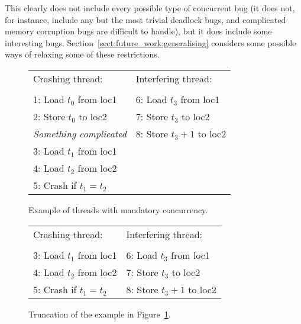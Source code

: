 This clearly does not include every possible type of concurrent bug
(it does not, for instance, include any but the most trivial deadlock
bugs, and complicated memory corruption bugs are difficult to handle),
but it does include some interesting bugs.
Section~\ref{sect:future_work:generalising} considers some possible
ways of relaxing some of these restrictions.

\begin{figure}
\begin{centering}
\hfill
\begin{tabular}{p{8cm}l}
Crashing thread:\hfill         & Interfering thread: \\
\\
1: Load $t_0$ from loc1        & 6: Load $t_3$ from loc1 \\
2: Store $t_0$ to loc2         & 7: Store $t_3$ to loc2 \\
\textit{Something complicated} & 8: Store $t_3 + 1$ to loc2 \\
3: Load $t_1$ from loc1        & \\
4: Load $t_2$ from loc2        & \\
5: Crash if $t_1 = t_2$ & \\
\end{tabular}
\hfill
\end{centering}
\caption{Example of threads with mandatory concurrency.}
\label{fig:mandatory_concurrency1}
\end{figure}

\begin{figure}
\begin{centering}
\hfill
\begin{tabular}{p{8cm}l}
Crashing thread:          & Interfering thread: \\
\\
3: Load $t_1$ from loc1   & 6: Load $t_3$ from loc1 \\
4: Load $t_2$ from loc2   & 7: Store $t_3$ to loc2 \\
5: Crash if $t_1 = t_2$   & 8: Store $t_3 + 1$ to loc2
\end{tabular}
\hfill
\end{centering}
\caption{Truncation of the example in Figure~\ref{fig:mandatory_concurrency1}.}
\label{fig:mandatory_concurrency2}
\end{figure}

